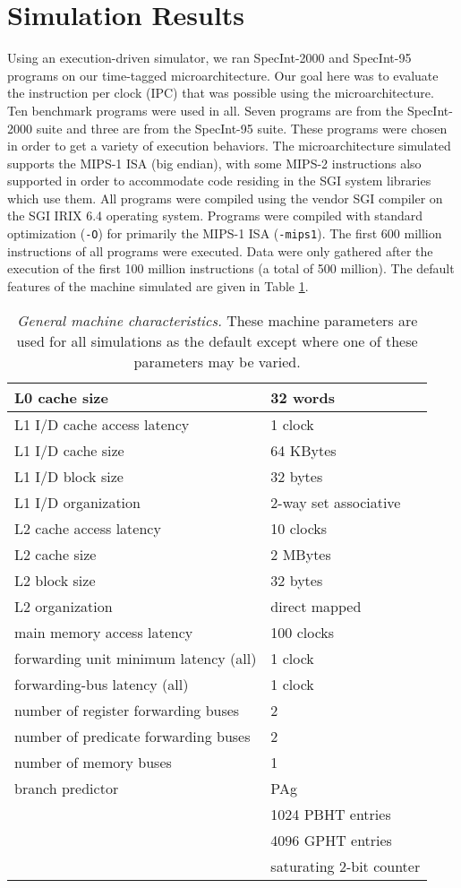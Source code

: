 \documentclass[10pt,dvips]{article}
\begin{document}
\section{Simulation Results}
%
Using an execution-driven simulator, we ran
SpecInt-2000 and SpecInt-95 programs on our
time-tagged microarchitecture.  
Our goal here was to evaluate
the instruction per clock (IPC) that was possible using
the microarchitecture.
Ten benchmark programs were used
in all.  
Seven programs are from the SpecInt-2000 suite and
three are from the SpecInt-95 suite.  
These programs were
chosen in order to get a variety of execution behaviors.
The microarchitecture simulated supports 
the MIPS-1 ISA (big endian), with some MIPS-2
instructions also supported in order to accommodate code residing in
the SGI system libraries which use them.
All programs were compiled using the vendor SGI compiler on
the SGI IRIX 6.4 operating system.
Programs were compiled with
standard optimization ({\tt -O}) for primarily the MIPS-1 ISA ({\tt -mips1}).
The first 600 million instructions of all programs were
executed.  Data were only gathered after the execution of
the first 100 million instructions (a total of 500 million).
The default features of the machine simulated are
given in Table \ref{tab:params}.
%
\begin{table}
\begin{center}
\caption{{\em General machine characteristics.}
These machine parameters are used for all simulations as
the default except where one of these parameters may be varied.}
\label{tab:params}
\begin{tabular}{|l|l|}
\hline 
L0 cache size&32 words\\
\hline 
L1 I/D cache access latency&1 clock\\
\hline
L1 I/D cache size&64 KBytes\\
\hline
L1 I/D block size&32 bytes\\
\hline
L1 I/D organization&2-way set associative\\
\hline
L2 cache access latency&10 clocks\\
\hline
L2 cache size&2 MBytes\\
\hline
L2 block size&32 bytes\\
\hline
L2 organization&direct mapped\\
\hline
main memory access latency&100 clocks\\
\hline
forwarding unit minimum latency (all)&1 clock\\
\hline
forwarding-bus latency (all)&1 clock\\
\hline
number of register forwarding buses&2\\
\hline
number of predicate forwarding buses&2\\
\hline
number of memory buses&1\\
\hline
branch predictor&PAg\\
\cline{2-2}
 & 1024 PBHT entries\\
\cline{2-2}
 & 4096 GPHT entries\\
\cline{2-2}
 & saturating 2-bit counter\\
\hline
\end{tabular}
\end{center}
\end{table}
\end{document}
